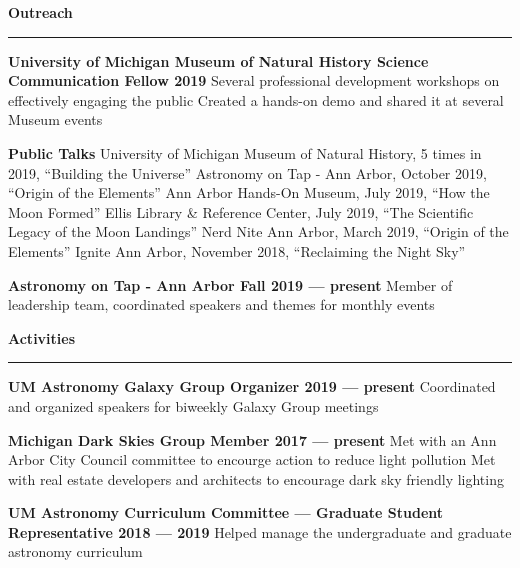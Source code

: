 \documentclass[10pt]{article}
\newcommand{\header}[1]{\vspace{2em}\par \textbf{\large #1}\strut\hrule\vspace{0em}}
\newcommand{\actionHeader}[2]{\textbf{#1 \hfill #2}}
\newcommand{\indentedItem}[1]{\newline\null\qquad #1}
\begin{document}


\pagebreak

\header{Outreach}

\actionHeader{University of Michigan Museum of Natural History Science Communication Fellow}{2019}
\indentedItem{Several professional development workshops on effectively engaging the public}
\indentedItem{Created a hands-on demo and shared it at several Museum events}

\actionHeader{Public Talks}{}
\indentedItem{University of Michigan Museum of Natural History, 5 times in 2019, ``Building the Universe''}
\indentedItem{Astronomy on Tap - Ann Arbor, October 2019, ``Origin of the Elements''}
\indentedItem{Ann Arbor Hands-On Museum, July 2019, ``How the Moon Formed''}
\indentedItem{Ellis Library \& Reference Center, July 2019, ``The Scientific Legacy of the Moon Landings''}
\indentedItem{Nerd Nite Ann Arbor, March 2019, ``Origin of the Elements''}
\indentedItem{Ignite Ann Arbor, November 2018, ``Reclaiming the Night Sky''}

\actionHeader{Astronomy on Tap - Ann Arbor}{Fall 2019 --- present}
\indentedItem{Member of leadership team, coordinated speakers and themes for monthly events}

\header{Activities}

\actionHeader{UM Astronomy Galaxy Group Organizer}{2019 --- present}
\indentedItem{Coordinated and organized speakers for biweekly Galaxy Group meetings}

\actionHeader{Michigan Dark Skies Group Member}{2017 --- present}
\indentedItem{Met with an Ann Arbor City Council committee to encourge action to reduce light pollution}
\indentedItem{Met with real estate developers and architects to encourage dark sky friendly lighting}

\actionHeader{UM Astronomy Curriculum Committee --- Graduate Student Representative}{2018 --- 2019}
\indentedItem{Helped manage the undergraduate and graduate astronomy curriculum}
\end{document}
